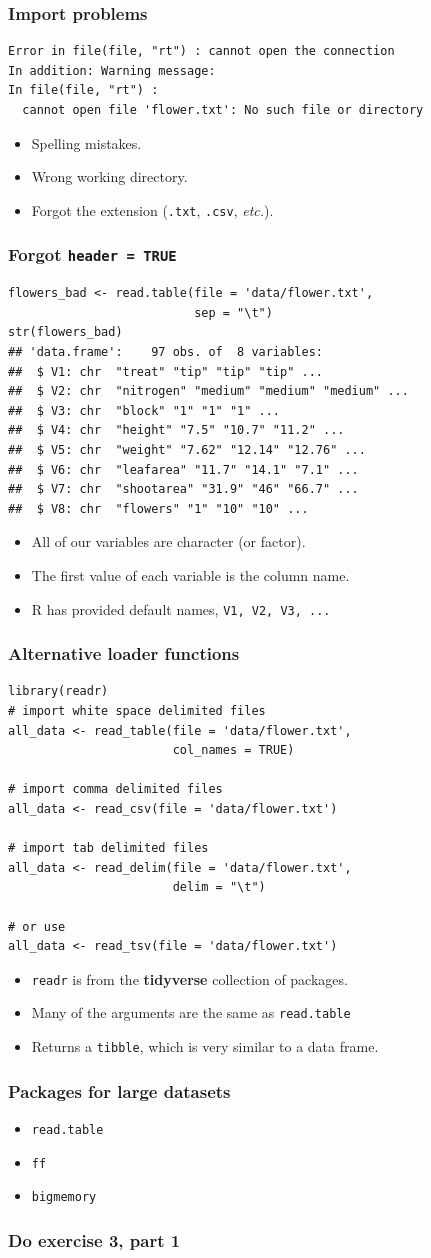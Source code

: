 \documentclass{beamer}
\newcommand{\lsting}[1]{\begin{lstlisting}[basicstyle=#1]}
\newcommand{\bi}{\begin{itemize}}
\newcommand{\li}{\item}
\newcommand{\ei}{\end{itemize}}
\newcommand{\bfr}[1]{\begin{frame}[fragile]\frametitle{{ #1 }}}
\begin{document}
\bfr{Import problems}
\lsting{\scriptsize}
Error in file(file, "rt") : cannot open the connection
In addition: Warning message:
In file(file, "rt") :
  cannot open file 'flower.txt': No such file or directory
\end{lstlisting}
\bi
\li Spelling mistakes.
\li Wrong working directory.
\li Forgot the extension (\verb|.txt|, \verb|.csv|, {\em etc.}).
\ei
\end{frame}

\bfr{Forgot {\tt header = TRUE}}
\lsting{\scriptsize}
flowers_bad <- read.table(file = 'data/flower.txt',
                          sep = "\t")
str(flowers_bad)
## 'data.frame':    97 obs. of  8 variables:
##  $ V1: chr  "treat" "tip" "tip" "tip" ...
##  $ V2: chr  "nitrogen" "medium" "medium" "medium" ...
##  $ V3: chr  "block" "1" "1" "1" ...
##  $ V4: chr  "height" "7.5" "10.7" "11.2" ...
##  $ V5: chr  "weight" "7.62" "12.14" "12.76" ...
##  $ V6: chr  "leafarea" "11.7" "14.1" "7.1" ...
##  $ V7: chr  "shootarea" "31.9" "46" "66.7" ...
##  $ V8: chr  "flowers" "1" "10" "10" ...
\end{lstlisting}
\bi
\li All of our variables are character (or factor).
\li The first value of each variable is the column name.
\li R has provided default names, \verb|V1, V2, V3, ...|
\ei
\end{frame}

\bfr{Alternative loader functions}
\lsting{\scriptsize}
library(readr)
# import white space delimited files
all_data <- read_table(file = 'data/flower.txt',
                       col_names = TRUE)

# import comma delimited files
all_data <- read_csv(file = 'data/flower.txt')

# import tab delimited files
all_data <- read_delim(file = 'data/flower.txt', 
                       delim = "\t")

# or use
all_data <- read_tsv(file = 'data/flower.txt')
\end{lstlisting}
\bi
\li \verb|readr| is from the {\bf tidyverse} collection of packages.
\li Many of the arguments are the same as \verb|read.table|
\li Returns a \verb|tibble|, which is very similar to a data frame.
\ei

\end{frame}

\bfr{Packages for large datasets}
\bi
\li \verb|read.table|
\li \verb|ff|
\li \verb|bigmemory|
\ei

\end{frame}

\bfr{Do exercise 3, part 1}
\end{frame}
\end{document}
